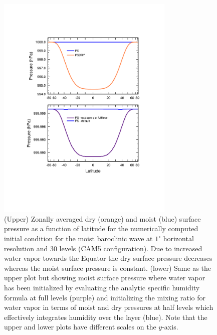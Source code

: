 \documentclass{agujournal}
\begin{document}
{\begin{figure}[h]
\centering
\includegraphics[width=20pc]{figs/01_baro_init.pdf}
\caption{(Upper) Zonally averaged dry (orange) and moist (blue) surface pressure as a function of latitude for the numerically computed initial condition for the moist baroclinic wave at $1^{\circ}$ horizontal resolution and 30 levels (CAM5 configuration). Due to increased water vapor towards the Equator the dry surface pressure decreases whereas the moist surface pressure is constant. (lower) Same as the upper plot but showing moist surface pressure where water vapor has been initialized by evaluating the analytic specific humidity formula at full levels (purple) and initializing the mixing ratio for water vapor in terms of moist and dry pressures at half levels which effectively integrates humidity over the layer (blue). Note that the upper and lower plots have different scales on the $y$-axis.}
\label{fig:baro_init}
\end{figure}

}
\end{document}
